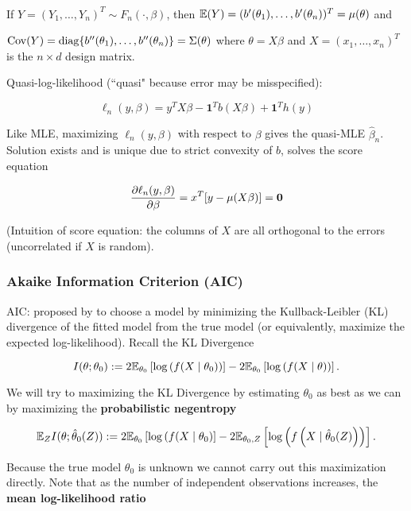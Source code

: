\

If \(Y = (Y_1, \ldots, Y_n)^T \sim F_n(\cdot, \beta)\), then \(\E(Y) = (b'(\theta_1), \ldots, b'(\theta_n))^T = \mu(\theta)\) and 

\(\Cov(Y) = \operatorname{diag}\{b''(\theta_1), \ldots, b''(\theta_n)\} = \Sigma(\theta)\) where \(\theta = X \beta\) and \(X = (x_1, \ldots ,x_n)^T\) is the \(n \times d\) design matrix.

Quasi-log-likelihood (``quasi" because error may be misspecified):

\[
\ell_n(y, \beta) = y^T X \beta - \boldsymbol{1}^Tb(X \beta) + \boldsymbol{1}^T h(y)
\]

Like MLE, maximizing \(\ell_n(y, \beta)\) with respect to \(\beta\) gives the quasi-MLE \(\hat{\beta}_n\). Solution exists and is unique due to strict convexity of \(b\), solves the score equation

\[
\pderiv{\ell_n(y,\beta)}{\beta} = x^T[y - \mu(X \beta)] = \boldsymbol{0}
\]

(Intuition of score equation: the columns of \(X\) are all orthogonal to the errors (uncorrelated if \(X\) is random).


\subsubsection{Akaike Information Criterion (AIC)}\label{linreg.aic.bic}

AIC: proposed by \citet{Akaike1973} to choose a model by minimizing the Kullback-Leibler (KL) divergence of the fitted model from the true model (or equivalently, maximize the expected log-likelihood). Recall the KL Divergence

\[
I(\theta; \theta_0) := 2\E_{\theta_0} \left[ \log \left( f(X \mid \theta_0) \right) \right] - 2 \E_{\theta_0} \left[ \log \left( f(X \mid \theta) \right) \right].
\]

We will try to maximizing the KL Divergence by estimating \(\theta_0\) as best as we can by maximizing the \textbf{probabilistic negentropy}

 \[
\E_Z I(\theta; \hat{\theta}_0(Z)) := 2\E_{\theta_0} \left[ \log \left( f(X \mid \theta_0 \right) \right] - 2 \E_{\theta_0, Z} \left[ \log \left( f \left(X \mid \hat{\theta}_0(Z) \right) \right) \right].
\]

Because the true model \(\theta_0\) is unknown we cannot carry out this maximization directly. Note that as the number of independent observations increases, the \textbf{mean log-likelihood ratio}

